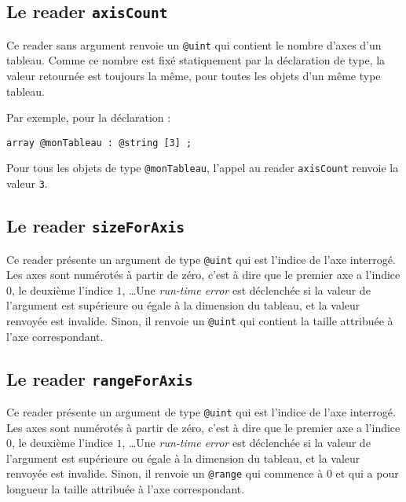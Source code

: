 \subsection{Le reader \lstinline[language=galgas]!axisCount!}

Ce reader sans argument renvoie un \lstinline[language=galgas]!@uint! qui contient le nombre d'axes d'un tableau. Comme ce nombre est fixé statiquement par la déclaration de type, la valeur retournée est toujours la même, pour toutes les objets d'un même type tableau.


Par exemple, pour la déclaration :
\begin{lstlisting}[language=galgas]
array @monTableau : @string [3] ;
\end{lstlisting}
Pour tous les objets de type \lstinline[language=galgas]!@monTableau!, l'appel au reader \lstinline[language=galgas]!axisCount! renvoie la valeur \lstinline[language=galgas]!3!.


\subsection{Le reader \lstinline[language=galgas]!sizeForAxis!}

Ce reader présente un argument de type \lstinline[language=galgas]!@uint! qui est l'indice de l'axe interrogé. Les axes sont numérotés à partir de zéro, c'est à dire que le premier axe a l'indice $0$, le deuxième l'indice $1$, \dots Une \emph{run-time error} est déclenchée si la valeur de l'argument est supérieure ou égale à la dimension du tableau, et la valeur renvoyée est invalide. Sinon, il renvoie un \lstinline[language=galgas]!@uint! qui contient la taille attribuée à l'axe correspondant.


\subsection{Le reader \lstinline[language=galgas]!rangeForAxis!}

Ce reader présente un argument de type \lstinline[language=galgas]!@uint! qui est l'indice de l'axe interrogé. Les axes sont numérotés à partir de zéro, c'est à dire que le premier axe a l'indice $0$, le deuxième l'indice $1$, \dots Une \emph{run-time error} est déclenchée si la valeur de l'argument est supérieure ou égale à la dimension du tableau, et la valeur renvoyée est invalide. Sinon, il renvoie un \lstinline[language=galgas]!@range! qui commence à $0$ et qui a pour longueur la taille attribuée à l'axe correspondant.





